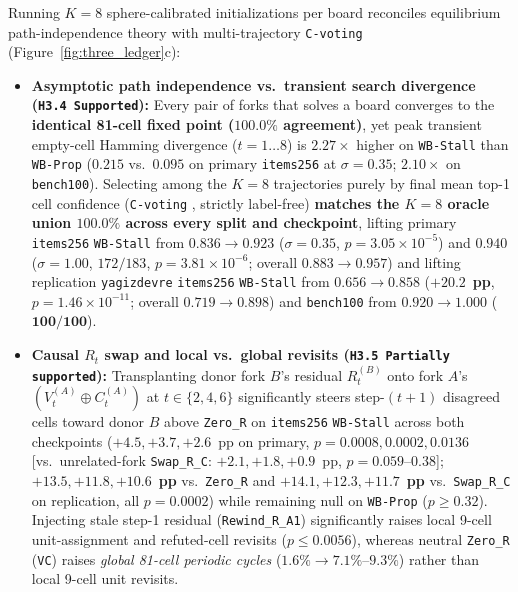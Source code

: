 \documentclass[10pt,letterpaper]{article}
\begin{document}
Running $K=8$ sphere-calibrated initializations per board reconciles equilibrium path-independence theory \cite{anil2022path} with multi-trajectory \texttt{C-voting} \cite{kubo2026cvoting} (Figure~\ref{fig:three_ledger}c):
\begin{itemize}
  \item \textbf{Asymptotic path independence vs.\ transient search divergence (\texttt{H3.4 Supported}):} Every pair of forks that solves a board converges to the \textbf{identical 81-cell fixed point ($100.0\%$ agreement)}, yet peak transient empty-cell Hamming divergence ($t=1\dots 8$) is $\mathbf{2.27\times}$ higher on \texttt{WB-Stall} than \texttt{WB-Prop} ($0.215$ vs.\ $0.095$ on primary \texttt{items256} at $\sigma=0.35$; $2.10\times$ on \texttt{bench100}). Selecting among the $K=8$ trajectories purely by final mean top-1 cell confidence (\texttt{C-voting} \cite{kubo2026cvoting}, strictly label-free) \textbf{matches the $K=8$ oracle union $100.0\%$ across every split and checkpoint}, lifting primary \texttt{items256} \texttt{WB-Stall} from $\mathbf{0.836 \to 0.923}$ ($\sigma=0.35$, $p=3.05\times 10^{-5}$) and $\mathbf{0.940}$ ($\sigma=1.00$, $172/183$, $p=3.81\times 10^{-6}$; overall $\mathbf{0.883 \to 0.957}$) and lifting replication \texttt{yagizdevre} \texttt{items256} \texttt{WB-Stall} from $\mathbf{0.656 \to 0.858}$ ($\mathbf{+20.2}$~\textbf{pp}, $p=1.46\times 10^{-11}$; overall $\mathbf{0.719 \to 0.898}$) and \texttt{bench100} from $\mathbf{0.920 \to 1.000}$ ($\mathbf{100/100}$).
  \item \textbf{Causal $R_t$ swap and local vs.\ global revisits (\texttt{H3.5 Partially supported}):} Transplanting donor fork $B$'s residual $R_t^{(B)}$ onto fork $A$'s $(V_t^{(A)} \oplus C_t^{(A)})$ at $t \in \{2,4,6\}$ significantly steers step-$(t+1)$ disagreed cells toward donor $B$ above \texttt{Zero\_R} on \texttt{items256} \texttt{WB-Stall} across both checkpoints ($+4.5, +3.7, +2.6$~pp on primary, $p=0.0008, 0.0002, 0.0136$ [vs.\ unrelated-fork \texttt{Swap\_R\_C}: $+2.1, +1.8, +0.9$~pp, $p=0.059\text{--}0.38$]; $\mathbf{+13.5, +11.8, +10.6}$~\textbf{pp} vs.\ \texttt{Zero\_R} and $\mathbf{+14.1, +12.3, +11.7}$~\textbf{pp} vs.\ \texttt{Swap\_R\_C} on replication, all $p=0.0002$) while remaining null on \texttt{WB-Prop} ($p \ge 0.32$). Injecting stale step-1 residual (\texttt{Rewind\_R\_A1}) significantly raises local 9-cell unit-assignment and refuted-cell revisits ($p \le 0.0056$), whereas neutral \texttt{Zero\_R} (\texttt{VC}) raises \emph{global 81-cell periodic cycles} ($1.6\% \to 7.1\%$--$9.3\%$) rather than local 9-cell unit revisits.

\end{itemize}
\end{document}
